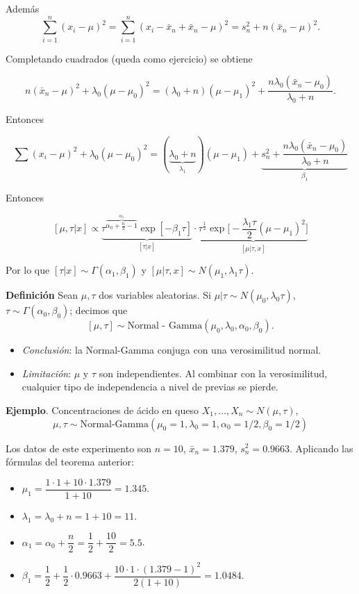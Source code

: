 \documentclass[
  12pt,
]{book}
\begin{document}
Además
\[\sum_{i=1}^n (x_i-\mu)^2 = \sum_{i=1}^n (x_i-\bar x_n + \bar x_n -\mu)^2 = s_n^2 + n(\bar x_n-\mu)^2.\]

Completando cuadrados (queda como ejercicio) se obtiene

\[n(\bar x_n -\mu)^2 + \lambda_0(\mu-\mu_0)^2 = (\lambda_0+n)(\mu-\mu_1)^2 + \dfrac{n\lambda_0(\bar x_n-\mu_0)}{\lambda_0+n}.\]

Entonces

\[\sum(x_i-\mu)^2 +\lambda_0(\mu-\mu_0)^2 = (\underbrace{\lambda_0+n}_{\lambda_1})(\mu-\mu_1) + \underbrace{s_n^2+\dfrac{n\lambda_0(\bar x_n-\mu_0)}{\lambda_0+n}}_{\beta_1}\]

Entonces

\[[\mu,\tau|x] \propto \underbrace{\tau^{\overbrace{\alpha_0+\frac n2 -1}^{\alpha_1}}\exp[-\beta_1\tau]}_{[\tau|x]} \cdot \underbrace{\tau^{\frac 12} \exp\bigg[-\dfrac{\lambda_1\tau}{2}(\mu-\mu_1)^2\bigg]}_{[\mu|\tau,x]}\]

Por lo que \([\tau|x]\sim \Gamma(\alpha_1,\beta_1)\) y \([\mu|\tau,x] \sim N(\mu_1,\lambda_1\tau)\).

\textbf{Definición} Sean \(\mu,\tau\) dos variables aleatorias. Si \(\mu|\tau \sim N(\mu_0,\lambda_0\tau)\), \(\tau\sim\Gamma(\alpha_0,\beta_0)\); decimos que
\[[\mu, \tau]\sim \text{Normal - Gamma}(\mu_0,\lambda_0,\alpha_0,\beta_0).\]

\begin{itemize}
\item
  \emph{Conclusión}: la Normal-Gamma conjuga con una verosimilitud normal.
\item
  \emph{Limitación}: \(\mu\) y \(\tau\) son independientes. Al combinar con la verosimilitud, cualquier tipo de independencia a nivel de previas se pierde.
\end{itemize}

\textbf{Ejemplo}. Concentraciones de ácido en queso \(X_1,\dots, X_n\sim N(\mu,\tau)\),
\[\mu,\tau \sim \text{Normal-Gamma}(\mu_0 = 1, \lambda_0 = 1,\alpha_0 = 1/2, \beta_0 = 1/2)\]

Los datos de este experimento son \(n = 10\), \(\bar x_n = 1.379\), \(s_n^2 = 0.9663\). Aplicando las fórmulas del teorema anterior:

\begin{itemize}
\item
  \(\mu_1 = \dfrac{1\cdot 1 + 10\cdot 1.379}{1+10} = 1.345\).
\item
  \(\lambda_1 = \lambda_0+n = 1 +10 = 11\).
\item
  \(\alpha_1 = \alpha_0 + \dfrac n2 = \dfrac 12 +\dfrac{10}2 = 5.5\).
\item
  \(\beta_1 = \dfrac 12 + \dfrac 12\cdot 0.9663 + \dfrac{10\cdot1\cdot (1.379-1)^2}{2(1+10)} = 1.0484.\)
\end{itemize}
\end{document}

